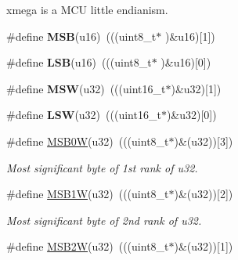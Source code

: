 xmega is a M\-C\-U little endianism. \begin{DoxyCompactItemize}
\item 
\hypertarget{group__group__xmega__utils_gabee1b74eceef5a0cf26efbf3ff87ccbf}{\#define {\bfseries M\-S\-B}(u16)~(((uint8\-\_\-t$\ast$ )\&u16)\mbox{[}1\mbox{]})}\label{group__group__xmega__utils_gabee1b74eceef5a0cf26efbf3ff87ccbf}

\item 
\hypertarget{group__group__xmega__utils_gabd2fa7b756342ae251e3a7a66670c2fe}{\#define {\bfseries L\-S\-B}(u16)~(((uint8\-\_\-t$\ast$ )\&u16)\mbox{[}0\mbox{]})}\label{group__group__xmega__utils_gabd2fa7b756342ae251e3a7a66670c2fe}

\item 
\hypertarget{group__group__xmega__utils_ga1ef82554a494eb528117ba8aeb529671}{\#define {\bfseries M\-S\-W}(u32)~(((uint16\-\_\-t$\ast$)\&u32)\mbox{[}1\mbox{]})}\label{group__group__xmega__utils_ga1ef82554a494eb528117ba8aeb529671}

\item 
\hypertarget{group__group__xmega__utils_ga253bf4f6ed3ba32d9b4fd98c7b840cbf}{\#define {\bfseries L\-S\-W}(u32)~(((uint16\-\_\-t$\ast$)\&u32)\mbox{[}0\mbox{]})}\label{group__group__xmega__utils_ga253bf4f6ed3ba32d9b4fd98c7b840cbf}

\item 
\hypertarget{group__group__xmega__utils_ga25110f05bdb5b5ea3fcb2854a1a07d7a}{\#define \hyperlink{group__group__xmega__utils_ga25110f05bdb5b5ea3fcb2854a1a07d7a}{M\-S\-B0\-W}(u32)~(((uint8\-\_\-t$\ast$)\&(u32))\mbox{[}3\mbox{]})}\label{group__group__xmega__utils_ga25110f05bdb5b5ea3fcb2854a1a07d7a}

\begin{DoxyCompactList}\small\item\em Most significant byte of 1st rank of {\itshape u32}. \end{DoxyCompactList}\item 
\hypertarget{group__group__xmega__utils_ga0f90ecd0b0f0e15608a95b8367b77ece}{\#define \hyperlink{group__group__xmega__utils_ga0f90ecd0b0f0e15608a95b8367b77ece}{M\-S\-B1\-W}(u32)~(((uint8\-\_\-t$\ast$)\&(u32))\mbox{[}2\mbox{]})}\label{group__group__xmega__utils_ga0f90ecd0b0f0e15608a95b8367b77ece}

\begin{DoxyCompactList}\small\item\em Most significant byte of 2nd rank of {\itshape u32}. \end{DoxyCompactList}\item 
\hypertarget{group__group__xmega__utils_ga0207e10a3c4bcca172463cd5e3ebd865}{\#define \hyperlink{group__group__xmega__utils_ga0207e10a3c4bcca172463cd5e3ebd865}{M\-S\-B2\-W}(u32)~(((uint8\-\_\-t$\ast$)\&(u32))\mbox{[}1\mbox{]})}\label{group__group__xmega__utils_ga0207e10a3c4bcca172463cd5e3ebd865}


\end{DoxyCompactItemize}
